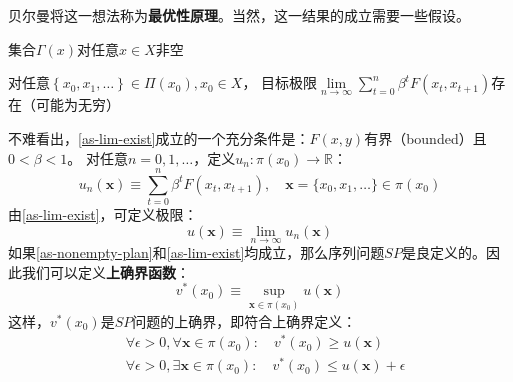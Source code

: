 贝尔曼将这一想法称为\textbf{最优性原理}。当然，这一结果的成立需要一些假设。
\begin{assumption} \label{as-nonempty-plan}
    集合$\Gamma\left(x\right)$对任意$x\in X$非空
\end{assumption}
\begin{assumption} \label{as-lim-exist}
    对任意$\left\{x_0, x_1, \ldots\right\} \in \Pi\left(x_0\right), x_0 \in X$，
        目标极限$\lim\limits_{n\rightarrow \infty}\sum_{t=0}^{n}\beta^t F\left(x_t,x_{t+1}\right)$存在（可能为无穷）
\end{assumption}
不难看出，\cref{as-lim-exist}成立的一个充分条件是：$F\left(x,y\right)$有界（bounded）且$0<\beta<1$。
对任意$n=0,1,\dots$，定义$u_n: \pi\left(x_0\right)\rightarrow \mathbb{R}$：
$$
u_n(\boldsymbol{x}) \equiv \sum_{t=0}^n \beta^t F\left(x_t, x_{t+1}\right), 
    \quad \boldsymbol{x}=\{x_0,x_1,\dots\} \in \pi\left(x_0\right)
$$
由\cref{as-lim-exist}，可定义极限：
\begin{equation*}
    u\left(\boldsymbol{x}\right) \equiv \lim _{n\rightarrow\infty}u_n\left(\boldsymbol{x}\right)
\end{equation*}
如果\cref{as-nonempty-plan}和\cref{as-lim-exist}均成立，那么序列问题$SP$是良定义的。因此我们可以定义\textbf{上确界函数}：
\begin{equation*}
    v^*\left(x_0\right)\equiv \sup _{\boldsymbol{x}\in\pi\left(x_0\right)} u\left(\boldsymbol{x}\right)
\end{equation*}
这样，$v^*\left(x_0\right)$是$SP$问题的上确界，即符合上确界定义：
\begin{equation*}
    \begin{aligned}
        &\forall \epsilon > 0, \forall \boldsymbol{x}\in \pi\left(x_0\right): 
            \quad v^*\left(x_0\right)\geq u\left(\boldsymbol{x}\right) \\
        &\forall \epsilon > 0, \exists \boldsymbol{x}\in\pi\left(x_0\right): 
            \quad v^*\left(x_0\right)\leq u\left(\boldsymbol{x}\right)+\epsilon
    \end{aligned}
\end{equation*}

